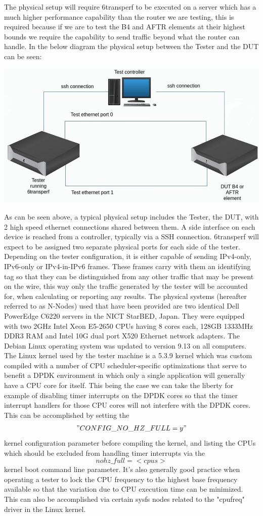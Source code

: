 \documentclass[a4paper,12p,titlepage]{article}
\begin{document}
The physical setup will require 6transperf to be executed on a server which has a much higher performance capability than the router we are testing, this is required because if we are to test the B4 and AFTR elements at their highest bounds we require the capability to send traffic beyond what the router can handle. In the below diagram the physical setup between the Tester and the DUT can be seen:

\includegraphics[width=\textwidth]{testsetup}

As can be seen above, a typical physical setup includes the Tester, the DUT, with 2 high speed ethernet connections shared between them. A side interface on each device is reached from a controller, typically via a SSH connection.
6transperf will expect to be assigned two separate physical ports for each side of the tester. Depending on the tester configuration, it is either capable of sending IPv4-only, IPv6-only or IPv4-in-IPv6 frames. These frames carry with them an identifying tag so that they can be distinguished from any other traffic that may be present on the wire, this way only the traffic generated by the tester will be accounted for, when calculating or reporting any results.
The physical systems (hereafter referred to as N-Nodes) used that have been provided are two identical Dell PowerEdge C6220 servers in the NICT StarBED, Japan. They were equipped with two 2GHz Intel Xeon E5-2650 CPUs having 8 cores each, 128GB 1333MHz DDR3 RAM and Intel 10G dual port X520 Ethernet network adapters. The Debian Linux operating system was updated to version 9.13 on all computers. The Linux kernel used by the tester machine is a 5.3.9 kernel which was custom compiled with a number of CPU scheduler-specific optimizations that serve to benefit a DPDK environment in which only a single application will generally have a CPU core for itself. This being the case we can take the liberty for example of disabling timer interrupts on the DPDK cores so that the timer interrupt handlers for those CPU cores will not interfere with the DPDK cores. This can be accomplished by setting the $$"CONFIG\_NO\_HZ\_FULL=y"$$ kernel configuration parameter before compiling the kernel, and listing the CPUs which should be excluded from handling timer interrupts via the $$nohz\_full=<cpus>$$ kernel boot command line parameter. It’s also generally good practice when operating a tester to lock the CPU frequency to the highest base frequency available so that the variation due to CPU execution time can be minimized. This can also be accomplished via certain sysfs nodes related to the "cpufreq" driver in the Linux kernel.
\end{document}
